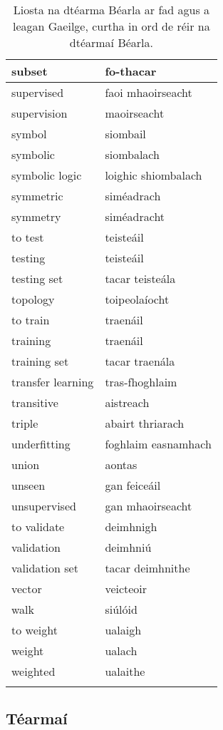 \begin{longtable}{|l|l|}
		subset&fo-thacar\\ \hline 
		supervised&faoi mhaoirseacht\\ \hline 
		supervision&maoirseacht\\ \hline 
		symbol&siombail\\ \hline 
		symbolic&siombalach\\ \hline 
		symbolic logic&loighic shiombalach\\ \hline 
		symmetric&siméadrach\\ \hline 
		symmetry&siméadracht\\ \hline 
		to test&teisteáil\\ \hline 
		testing&teisteáil\\ \hline 
		testing set&tacar teisteála\\ \hline 
		topology&toipeolaíocht\\ \hline 
		to train&traenáil\\ \hline 
		training&traenáil\\ \hline 
		training set&tacar traenála\\ \hline 
		transfer learning&tras-fhoghlaim\\ \hline 
		transitive&aistreach\\ \hline 
		triple&abairt thriarach\\ \hline 
		underfitting&foghlaim easnamhach\\ \hline 
		union&aontas\\ \hline 
		unseen&gan feiceáil\\ \hline 
		unsupervised&gan mhaoirseacht\\ \hline 
		to validate&deimhnigh\\ \hline 
		validation&deimhniú\\ \hline 
		validation set&tacar deimhnithe\\ \hline 
		vector&veicteoir\\ \hline 
		walk&siúlóid\\ \hline 
		to weight&ualaigh\\ \hline 
		weight&ualach\\ \hline 
		weighted&ualaithe\\ \hline 
\caption{Liosta na dtéarma Béarla ar fad agus a leagan Gaeilge, curtha in ord de réir na dtéarmaí Béarla.}
\label{tab-terms-en-ga}
\end{longtable}

\newpage \subsection{Téarmaí}
